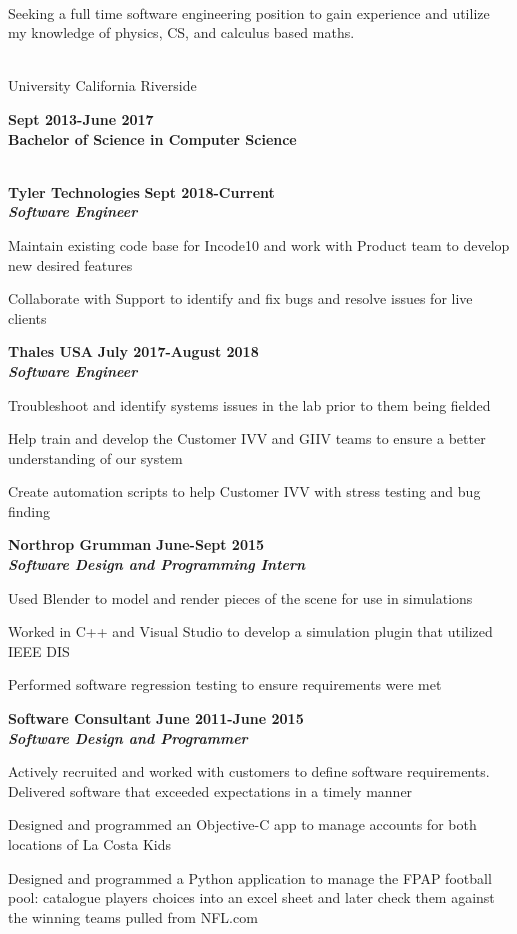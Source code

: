 \documentclass[10pt]{article}
\newcommand{\thing}[1][]{\item #1}
\newcommand{\sectionheader}[1]{
    \vspace{3pt}
    \StrSplit{#1}{3}{\firstpart}{\lastpart} %
    \textbf{\LARGE
        \firstpart
        \lastpart
    }\\[5pt]
}
\newcommand{\dates}[2]{
    \textbf{#1-#2}
}
\begin{document}
    \sectionheader{Objective}
    Seeking a full time software engineering position to gain 
    experience and utilize my knowledge of physics, CS, 
    and calculus based maths.
    
    \sectionheader{Education}
    University California Riverside \hfill %
    \dates{Sept 2013}{June 2017}\\
    \textbf{Bachelor of Science in Computer Science}
    
    \sectionheader{Experience}
    \textbf{\large Tyler Technologies} \hfill \dates{Sept 2018}{Current}\\
    \textit{\textbf{Software Engineer}}
    \begin{things}
        \thing Maintain existing code base for Incode10
                    and work with Product team to develop new desired features
        \thing Collaborate with Support to identify and fix bugs and resolve
                    issues for live clients
    \end{things}

    \textbf{\large Thales USA} \hfill \dates{July 2017}{August 2018}\\
    \textit{\textbf{Software Engineer}}
    \begin{things}
        \thing Troubleshoot and identify systems issues in 
                    the lab prior to them being fielded
        \thing Help train and develop the Customer IVV and 
                    GIIV teams to ensure a better understanding of our system
        \thing Create automation scripts to help Customer IVV
                with stress testing and bug finding
    \end{things}

    \textbf{\large Northrop Grumman} \hfill \dates{June}{Sept 2015}\\
    \textit{\textbf{Software Design and Programming Intern}}
    \begin{things}
        \thing Used Blender to model and render pieces of the scene
                for use in simulations
        \thing Worked in C++ and Visual Studio to develop a simulation
                plugin that utilized IEEE DIS
        \thing Performed software regression testing to ensure requirements
                were met
    \end{things}

    \textbf{\large Software Consultant} \hfill \dates{June 2011}{June 2015}\\
    \textit{\textbf{Software Design and Programmer}}
    \begin{things}
        \thing Actively recruited and worked with customers to define
                software requirements. Delivered software that exceeded
                expectations in a timely manner
        \thing Designed and programmed an Objective-C app to manage
                accounts for both locations of La Costa Kids
        \thing Designed and programmed a Python application to manage
                the FPAP football pool: catalogue players choices
                into an excel sheet and later check them against the
                winning teams pulled from NFL.com
    \end{things}
\end{document}
